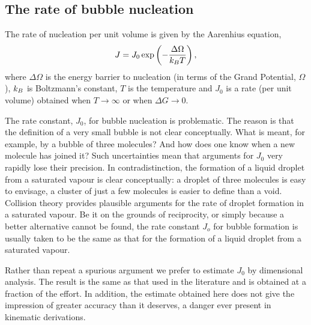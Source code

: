 \subsection{The rate of bubble nucleation}


The rate of nucleation per unit volume is given by the Aarenhius equation, 
\begin{align}
J = J_0\exp \lr{-\frac{\Delta \Omega}{\kB T}},%
\label{eqn:nuc:J}
\end{align}
where $\Delta \Omega$ is the energy barrier to nucleation (in terms of the Grand Potential, $\Omega$),
$k_B$ is Boltzmann's constant, $T$ is the temperature
and $J_0$ is a rate  (per unit volume) obtained when $T\rightarrow \infty$ or when $\Delta G \rightarrow 0$.

The rate constant, $J_0$, for bubble nucleation is problematic.
The reason is that the definition of a very small bubble is not clear conceptually.
What is meant, for example, by a bubble of three molecules?
And how does one know when a new molecule has joined it?
Such uncertainties mean that arguments for $J_0$ very rapidly lose their precision\cite{}.
In contradistinction, the formation of a liquid droplet from a saturated vapour is clear conceptually:
a droplet of three molecules is easy to envisage, 
a cluster of just a few molecules is easier to define than a void.
Collision theory provides plausible arguments for the rate of droplet formation in a saturated vapour\cite{}.
%
Be it on the grounds of reciprocity, or simply because a better alternative cannot be found,
the rate constant $J_o$ for bubble formation is usually taken to be the same 
as that for the formation of a liquid droplet from a saturated vapour.


Rather than repeat a spurious argument we prefer to estimate $J_0$ by dimensional analysis.
The result is the same as that used in the literature and is obtained at a fraction of the effort.
In addition, the estimate obtained here does not give the impression of greater accuracy than it deserves,
a danger ever present in kinematic derivations.

